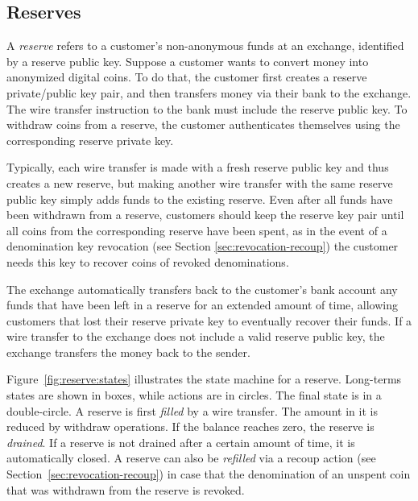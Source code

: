 
\subsection{Reserves}

A \emph{reserve} refers to a customer's non-anonymous funds at an exchange,
identified by a reserve public key.  Suppose a customer wants to convert money
into anonymized digital coins.  To do that, the customer first creates a
reserve private/public key pair, and then transfers money via their bank to the
exchange.  The wire transfer instruction to the bank must include the reserve
public key.  To withdraw coins from a reserve, the customer authenticates
themselves using the corresponding reserve private key.

Typically, each wire transfer is made with a fresh reserve public key and thus
creates a new reserve, but making another wire transfer with the same reserve
public key simply adds funds to the existing reserve.  Even after all funds
have been withdrawn from a reserve, customers should keep the reserve key pair
until all coins from the corresponding reserve have been spent, as in the event
of a denomination key revocation (see Section \ref{sec:revocation-recoup}) the
customer needs this key to recover coins of revoked denominations.

The exchange automatically transfers back to the customer's bank account any
funds that have been left in a reserve for an extended amount of time, allowing
customers that lost their reserve private key to eventually recover their
funds.  If a wire transfer to the exchange does not include a valid reserve public key,
the exchange transfers the money back to the sender.

Figure~\ref{fig:reserve:states} illustrates the state machine for a reserve.
Long-terms states are shown in boxes, while actions are in circles.  The final
state is in a double-circle.  A reserve is first {\em filled} by a wire
transfer. The amount in it is reduced by withdraw operations. If the balance
reaches zero, the reserve is {\em drained}. If a reserve is not drained after
a certain amount of time, it is automatically closed.  A reserve can also be
{\em refilled} via a recoup action (see Section~\ref{sec:revocation-recoup}) in case
that the denomination of an unspent coin that was withdrawn from the reserve
is revoked.

